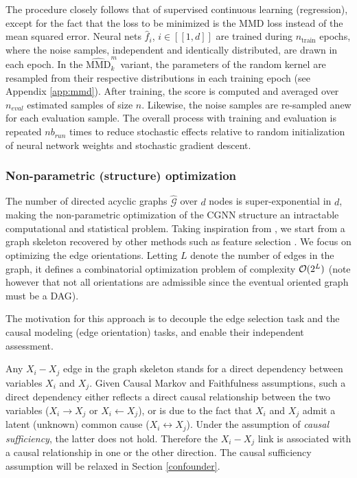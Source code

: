 \documentclass[a4paper, 11pt]{article}
\begin{document}
The procedure closely follows that of supervised continuous learning (regression), except for the fact that the loss to be minimized is the MMD loss instead of the mean squared error.
Neural nets $\hat{f}_i$, $i \in [[1,d]]$ are trained during $n_\text{train}$ epochs, where the noise samples, independent and identically distributed, are drawn in each epoch. In the $\widehat{\text{MMD}}_k^m$ variant, the parameters of the random kernel are resampled from their respective distributions in each training epoch (see Appendix \ref{app:mmd}). After training, the score is computed and averaged over $n_{eval}$ estimated samples of size $n$. Likewise, the noise samples are re-sampled anew for each evaluation sample. The overall process with training and evaluation is repeated $nb_{run}$ times to reduce stochastic effects relative to random initialization of neural network weights and stochastic gradient descent. 


\subsubsection{Non-parametric (structure) optimization}  \label{search_structure}\label{ModelSearch} \label{sec:nonparam}


The number of directed acyclic graphs $\mathcal{\hat G}$ over $d$ nodes is super-exponential in $d$, making the non-parametric optimization of the CGNN structure an intractable computational and statistical problem. 
Taking inspiration from \cite{tsamardinos2006max,nandy2015high}, we start from a graph skeleton recovered by other methods such as  feature selection \citep{yamada2014high}. We  focus on optimizing the edge orientations. Letting $L$ denote the number of edges in the graph, it defines a combinatorial optimization problem of  complexity ${\cal O}(2^L)$ (note however that not all orientations are admissible since the eventual oriented graph must be a DAG). 

The motivation for this approach is to decouple the edge selection task and the causal modeling (edge orientation) tasks, and enable their independent assessment.

Any $X_i-X_j$ edge in the graph skeleton stands for a direct dependency between variables $X_i$ and $X_j$.
Given Causal Markov and Faithfulness assumptions, such a direct dependency either reflects a direct causal relationship between the two variables ($X_i \rightarrow X_j$ or $X_i \leftarrow X_j$), or is due to the fact that $X_i$ and $X_j$ admit a latent (unknown) common cause ($X_i \leftrightarrow X_j$). Under the assumption of \textit{causal sufficiency}, the latter does not hold. Therefore the $X_i-X_j$ link is associated with a causal relationship in one or the other direction. The causal sufficiency assumption will be relaxed in Section \ref{confounder}.
\end{document}

